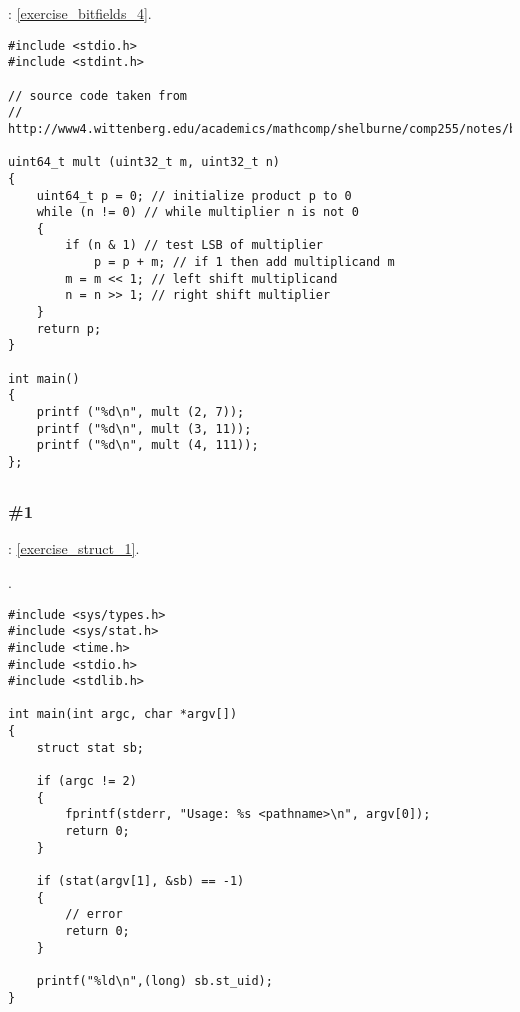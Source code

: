 \Exercise: \ref{exercise_bitfields_4}.


\begin{lstlisting}
#include <stdio.h>
#include <stdint.h>

// source code taken from
// http://www4.wittenberg.edu/academics/mathcomp/shelburne/comp255/notes/binarymultiplication.pdf

uint64_t mult (uint32_t m, uint32_t n)
{
    uint64_t p = 0; // initialize product p to 0 
    while (n != 0) // while multiplier n is not 0 
    { 
        if (n & 1) // test LSB of multiplier 
            p = p + m; // if 1 then add multiplicand m 
        m = m << 1; // left shift multiplicand 
        n = n >> 1; // right shift multiplier 
    }
    return p;
}

int main()
{
    printf ("%d\n", mult (2, 7));
    printf ("%d\n", mult (3, 11));
    printf ("%d\n", mult (4, 111));
};
\end{lstlisting}

\subsection{}

\subsubsection{\Exercise \#1}
\label{exercise_solutions_struct_1}

\Exercise: \ref{exercise_struct_1}.

.

\begin{lstlisting}
#include <sys/types.h>
#include <sys/stat.h>
#include <time.h>
#include <stdio.h>
#include <stdlib.h>

int main(int argc, char *argv[])
{
    struct stat sb;

    if (argc != 2) 
    {
        fprintf(stderr, "Usage: %s <pathname>\n", argv[0]);
        return 0;
    }

    if (stat(argv[1], &sb) == -1) 
    {
    	// error
        return 0;
    }

    printf("%ld\n",(long) sb.st_uid);
}
\end{lstlisting}

